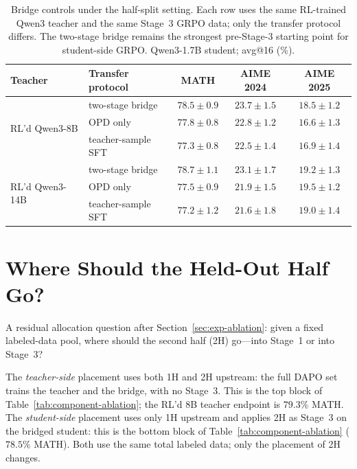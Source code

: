 \documentclass{article}
\begin{document}
\begin{table}[!h]
\caption{Bridge controls under the half-split setting. Each row uses the same RL-trained Qwen3 teacher and the same Stage~3 GRPO data; only the transfer protocol differs. The two-stage bridge remains the strongest pre-Stage-3 starting point for student-side GRPO. Qwen3-1.7B student; avg@16 (\%).}
\label{tab:qwen-half-split-controls}
\centering
\small
\begin{tabular}{@{}llccc@{}}
\toprule
Teacher & Transfer protocol & MATH & AIME 2024 & AIME 2025 \\
\midrule
\multirow{3}{*}{RL'd Qwen3-8B}  & two-stage bridge        & $78.5 \pm 0.9$ & $23.7 \pm 1.5$ & $18.5 \pm 1.2$ \\
                                & OPD only                & $77.8 \pm 0.8$ & $22.8 \pm 1.2$ & $16.6 \pm 1.3$ \\
                                & teacher-sample SFT      & $77.3 \pm 0.8$ & $22.5 \pm 1.4$ & $16.9 \pm 1.4$ \\
\midrule
\multirow{3}{*}{RL'd Qwen3-14B} & two-stage bridge        & $78.7 \pm 1.1$ & $23.1 \pm 1.7$ & $19.2 \pm 1.3$ \\
                                & OPD only                & $77.5 \pm 0.9$ & $21.9 \pm 1.5$ & $19.5 \pm 1.2$ \\
                                & teacher-sample SFT      & $77.2 \pm 1.2$ & $21.6 \pm 1.8$ & $19.0 \pm 1.4$ \\
\bottomrule
\end{tabular}
\end{table}

\section{Where Should the Held-Out Half Go?}
\label{app:held-out-allocation}

A residual allocation question after Section~\ref{sec:exp-ablation}: given a fixed labeled-data pool, where should the second half (2H) go---into Stage~1 or into Stage~3?

The \emph{teacher-side} placement uses both 1H and 2H upstream: the full DAPO set trains the teacher and the bridge, with no Stage~3. This is the top block of Table~\ref{tab:component-ablation}; the RL'd 8B teacher endpoint is $79.3\%$ MATH. The \emph{student-side} placement uses only 1H upstream and applies 2H as Stage~3 on the bridged student: this is the bottom block of Table~\ref{tab:component-ablation} ($78.5\%$ MATH). Both use the same total labeled data; only the placement of 2H changes.
\end{document}
